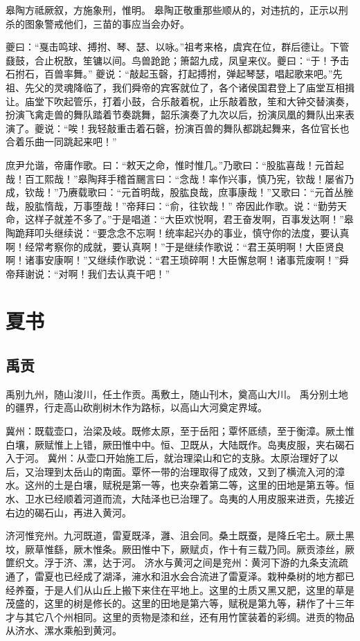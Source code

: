 \documentclass[a4paper,12pt,UTF8,twoside]{ctexbook}
\begin{document}
皋陶方祗厥叙，方施象刑，惟明。
皋陶正敬重那些顺从的，对违抗的，正示以刑杀的图象警戒他们，三苗的事应当会办好。

夔曰：“戛击鸣球、搏拊、琴、瑟、以咏。”祖考来格，虞宾在位，群后德让。下管鼗鼓，合止柷敔，笙镛以间。鸟兽跄跄；箫韶九成，凤皇来仪。夔曰：“于！予击石拊石，百兽率舞。”
夔说：“敲起玉磬，打起搏拊，弹起琴瑟，唱起歌来吧。”先祖、先父的灵魂降临了，我们舜帝的宾客就位了，各个诸侯国君登上了庙堂互相揖让。庙堂下吹起管乐，打着小鼓，合乐敲着柷，止乐敲着敔，笙和大钟交替演奏，扮演飞禽走兽的舞队踏着节奏跳舞，韶乐演奏了九次以后，扮演凤凰的舞队出来表演了。夔说：“唉！我轻敲重击着石磬，扮演百兽的舞队都跳起舞来，各位官长也合着乐曲一同跳起来吧！”

庶尹允谐，帝庸作歌。曰：“敕天之命，惟时惟几。”乃歌曰：“股肱喜哉！元首起哉！百工熙哉！”皋陶拜手稽首颺言曰：“念哉！率作兴事，慎乃宪，钦哉！屡省乃成，钦哉！”乃赓载歌曰：“元首明哉，股肱良哉，庶事康哉！”又歌曰：“元首丛脞哉，股肱惰哉，万事堕哉！”帝拜曰：“俞，往钦哉！”
帝因此作歌。说：“勤劳天命，这样子就差不多了。”于是唱道：“大臣欢悦啊，君王奋发啊，百事发达啊！”皋陶跪拜叩头继续说：“要念念不忘啊！统率起兴办的事业，慎守你的法度，要认真啊！经常考察你的成就，要认真啊！”于是继续作歌说：“君王英明啊！大臣贤良啊！诸事安康啊！”又继续作歌说：“君王琐碎啊！大臣懈怠啊！诸事荒废啊！”舜帝拜谢说：“对啊！我们去认真干吧！”

\part{夏书}

\chapter{禹贡}

禹别九州，随山浚川，任土作贡。禹敷土，随山刊木，奠高山大川。
禹分别土地的疆界，行走高山砍削树木作为路标，以高山大河奠定界域。

冀州：既载壶口，治梁及岐。既修太原，至于岳阳；覃怀厎绩，至于衡漳。厥土惟白壤，厥赋惟上上错，厥田惟中中。恒、卫既从，大陆既作。岛夷皮服，夹右碣石入于河。
冀州：从壶口开始施工后，就治理梁山和它的支脉。太原治理好了以后，又治理到太岳山的南面。覃怀一带的治理取得了成效，又到了横流入河的漳水。这州的土是白壤，赋税是第一等，也夹杂着第二等，这里的田地是第五等。恒水、卫水已经顺着河道而流，大陆泽也已治理了。岛夷的人用皮服来进贡，先接近右边的碣石山，再进入黄河。

济河惟兖州。九河既道，雷夏既泽，灉、沮会同。桑土既蚕，是降丘宅土。厥土黑坟，厥草惟繇，厥木惟条。厥田惟中下，厥赋贞，作十有三载乃同。厥贡漆丝，厥篚织文。浮于济、漯，达于河。
济水与黄河之间是兖州：黄河下游的九条支流疏通了，雷夏也已经成了湖泽，澭水和沮水会合流进了雷夏泽。栽种桑树的地方都已经养蚕，于是人们从山丘上搬下来住在平地上。这里的土质又黑又肥，这里的草是茂盛的，这里的树是修长的。这里的田地是第六等，赋税是第九等，耕作了十三年才与其它八个州相同。这里的贡物是漆和丝，还有用竹筐装着的彩绸。进贡的物品从济水、漯水乘船到黄河。
\end{document}
